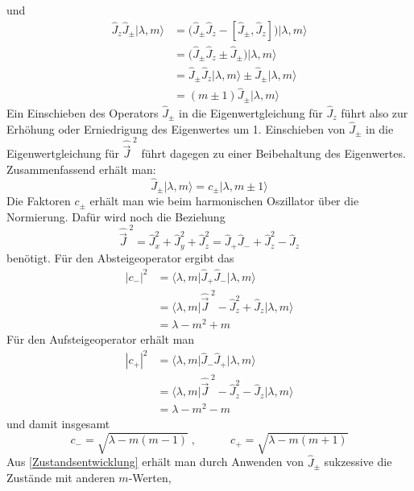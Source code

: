 \documentclass[9pt]{report}
\begin{document}
und
\begin{align}
\hat{J}_{z}\hat{J}_{\pm}\big|\lambda,m\big\rangle &= \big(\hat{J}_{\pm}\hat{J}_{z}-[\hat{J}_{\pm},\hat{J}_{z}]\big)\big|\lambda,m\rangle\\
&= \big(\hat{J}_{\pm}\hat{J}_{z}\pm\hat{J}_{\pm}\big)\big|\lambda,m\rangle\\
&= \hat{J}_{\pm}\hat{J}_{z}\big|\lambda,m\big\rangle\pm\hat{J}_{\pm}\big|\lambda,m\big\rangle\\
&= (m\pm 1)\hat{J}_{\pm}\big|\lambda,m\big\rangle
\end{align}
Ein Einschieben des Operators $\hat{J}_{\pm}$ in die Eigenwertgleichung für $\hat{J}_{z}$ führt also zur Erhöhung oder Erniedrigung des Eigenwertes um 1. Einschieben von $\hat{J}_{\pm}$ in die Eigenwertgleichung für $\hat{\vec{J}}^{\;2}$ führt dagegen zu einer Beibehaltung des Eigenwertes. Zusammenfassend erhält man:
\begin{equation}
\hat{J}_{\pm}\big|\lambda,m\big\rangle = c_{\pm}\big|\lambda,m\pm 1\big\rangle\label{Zustandsentwicklung}
\end{equation}
Die Faktoren $c_{\pm}$ erhält man wie beim harmonischen Oszillator über die Normierung. Dafür wird noch die Beziehung
\begin{equation}
\hat{\vec{J}}^{\;2}=\hat{J}_{x}^{2}+\hat{J}_{y}^{2}+\hat{J}_{z}^{2}=\hat{J}_{+}\hat{J}_{-}+\hat{J}_{z}^{2}-\hat{J}_{z}
\end{equation}
benötigt. Für den Absteigeoperator ergibt das
\begin{align}
|c_{-}|^{2} &= \big\langle\lambda,m\big|\hat{J}_{+}\hat{J}_{-}\big|\lambda,m\big\rangle\\
&= \big\langle\lambda,m\big|\hat{\vec{J}}^{\;2}-\hat{J}_{z}^{2}+\hat{J}_{z}\big|\lambda,m\big\rangle\\
&= \lambda-m^{2}+m
\end{align}
Für den Aufsteigeoperator erhält man
\begin{align}
|c_{+}|^{2} &= \big\langle\lambda,m\big|\hat{J}_{-}\hat{J}_{+}\big|\lambda,m\big\rangle\\
&= \big\langle\lambda,m\big|\hat{\vec{J}}^{\;2}-\hat{J}_{z}^{2}-\hat{J}_{z}\big|\lambda,m\big\rangle\\
&= \lambda-m^{2}-m
\end{align}
und damit insgesamt
\begin{equation}
c_{-}=\sqrt{\lambda-m(m-1)}\;,\qquad\quad c_{+}=\sqrt{\lambda-m(m+1)}
\end{equation}
Aus \eqref{Zustandsentwicklung} erhält man durch Anwenden von $\hat{J}_{\pm}$ sukzessive die Zustände mit anderen $m$-Werten,
\end{document}
